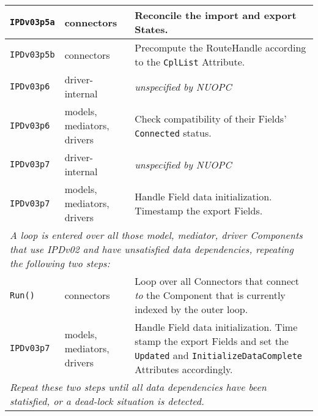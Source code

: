 \begin{longtable}[h]{|p{35mm}|p{4cm}|p{6cm}|}
     {\tt IPDv03p5a}& connectors                  & Reconcile the import and export States.\\ \hline
     {\tt IPDv03p5b}& connectors                  & Precompute the RouteHandle according to the {\tt CplList} Attribute.\\ \hline
     {\tt IPDv03p6} & driver-internal             & {\em unspecified by NUOPC}\\ \hline
     {\tt IPDv03p6} & models, mediators, drivers  & Check compatibility of their Fields' {\tt Connected} status.\\ \hline
     {\tt IPDv03p7} & driver-internal             & {\em unspecified by NUOPC}\\ \hline
     {\tt IPDv03p7} & models, mediators, drivers  & Handle Field data initialization. Timestamp the export Fields.\\ \hline
     \multicolumn{3}{|p{13.5cm}|}{\it A loop is entered over all those model, mediator, driver Components that use IPDv02 and have
     unsatisfied data dependencies, repeating the following two steps:}\\ \hline
     {\tt Run()}    & connectors                  & Loop over all Connectors that connect {\it to} the Component that is currently indexed by the outer loop.\\ \hline
     {\tt IPDv03p7} & models, mediators, drivers  & Handle Field data initialization. Time stamp the export Fields and set the {\tt Updated} and {\tt InitializeDataComplete} Attributes accordingly.\\ \hline
     \multicolumn{3}{|p{13.5cm}|}{\it Repeat these two steps until all data
     dependencies have been statisfied, or a dead-lock situation is detected.}\\ 
     \hline\hline
\end{longtable}

